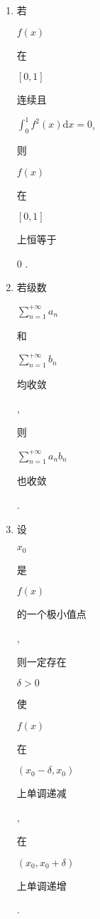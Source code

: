 \documentclass[10pt]{article}
\begin{document}
\begin{enumerate}
  \item \begin{CJK}{UTF8}{mj}若\end{CJK} $f(x)$ \begin{CJK}{UTF8}{mj}在\end{CJK} $[0,1]$ \begin{CJK}{UTF8}{mj}连续且\end{CJK} $\int_{0}^{1} f^{2}(x) \mathrm{d} x=0$, \begin{CJK}{UTF8}{mj}则\end{CJK} $f(x)$ \begin{CJK}{UTF8}{mj}在\end{CJK} $[0,1]$ \begin{CJK}{UTF8}{mj}上恒等于\end{CJK} 0 .

  \item \begin{CJK}{UTF8}{mj}若级数\end{CJK} $\sum_{n=1}^{+\infty} a_{n}$ \begin{CJK}{UTF8}{mj}和\end{CJK} $\sum_{n=1}^{+\infty} b_{n}$ \begin{CJK}{UTF8}{mj}均收敛\end{CJK}, \begin{CJK}{UTF8}{mj}则\end{CJK} $\sum_{n=1}^{+\infty} a_{n} b_{n}$ \begin{CJK}{UTF8}{mj}也收敛\end{CJK}.

  \item \begin{CJK}{UTF8}{mj}设\end{CJK} $x_{0}$ \begin{CJK}{UTF8}{mj}是\end{CJK} $f(x)$ \begin{CJK}{UTF8}{mj}的一个极小值点\end{CJK}, \begin{CJK}{UTF8}{mj}则一定存在\end{CJK} $\delta>0$ \begin{CJK}{UTF8}{mj}使\end{CJK} $f(x)$ \begin{CJK}{UTF8}{mj}在\end{CJK} $\left(x_{0}-\delta, x_{0}\right)$ \begin{CJK}{UTF8}{mj}上单调递减\end{CJK}, \begin{CJK}{UTF8}{mj}在\end{CJK} $\left(x_{0}, x_{0}+\delta\right)$ \begin{CJK}{UTF8}{mj}上单调递增\end{CJK}.

\end{enumerate}
\end{document}
